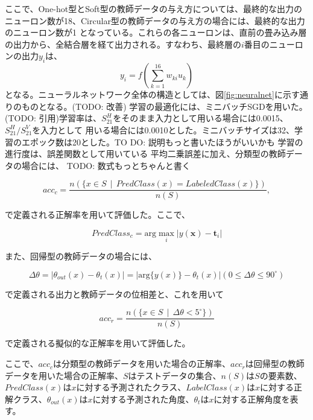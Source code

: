 \documentclass[11pt,a4paper,uplatex]{ujarticle}
\begin{document}
  ここで、One-hot型とSoft型の教師データの与え方については、最終的な出力のニューロン数が18、Circular型の教師データの与え方の場合には、最終的な出力のニューロン数が1
  となっている。これらの各ニューロンは、直前の畳み込み層の出力から、全結合層を経て出力される。すなわち、最終層の$i$番目のニューロンの出力$y_i$は、
  \[
    y_i = f(\sum_{k=1}^{16} w_{ki} u_k)
  \]
  となる。ニューラルネットワーク全体の構造としては、図\ref{fig:neuralnet}に示す通りのものとなる。(TODO: 改善)
  学習の最適化には、ミニバッチSGDを用いた。(TODO: 引用)学習率は、$S_{21}^H$をそのまま入力として用いる場合には0.0015、$S_{21}^{H}/S_{21}^{V}$を入力として
  用いる場合には0.0010とした。ミニバッチサイズは32、学習のエポック数は20とした。TO DO: 説明もっと書いたほうがいいかも
  学習の進行度は、誤差関数として用いている
  平均二乗誤差に加え、分類型の教師データの場合には、
  TODO: 数式もっとちゃんと書く

  \begin{equation}
    acc_{c} = \frac{n(\{x \in S \, \mid\, PredClass(x) = LabeledClass(x)\})}{n(S)},
  \end{equation} %

  で定義される正解率を用いて評価した。ここで、

  \begin{equation}
    PredClass_{c} = \mathrm{arg}\max_{i} |y(\mathbf{x}) - \mathbf{t}_i|
  \end{equation} %
  
  また、回帰型の教師データの場合には、

  \begin{equation}
    \Delta\theta = |\theta_{out}(x) - \theta_{t}(x)| =  |\mathrm{arg}\{y(x)\}- \theta_{t}(x)| ( 0 \le \Delta\theta \le 90^{\circ})
  \end{equation} %

  で定義される出力と教師データの位相差と、これを用いて

  \begin{equation}
    acc_{r} = \frac{n(\{x \in S \, \mid\, \Delta\theta < 5^{\circ}\})}{n(S)}
  \end{equation} %

  で定義される擬似的な正解率を用いて評価した。

  ここで、$acc_c$は分類型の教師データを用いた場合の正解率、$acc_r$は回帰型の教師データを用いた場合の正解率、$S$はテストデータの集合、$n(S)$は$S$の要素数、
  $PredClass(x)$は$x$に対する予測されたクラス、$LabelClass(x)$は$x$に対する正解クラス、$\theta_{out}(x)$は$x$に対する予測された角度、$\theta_{t}$は$x$に対する正解角度を表す。
\end{document}
